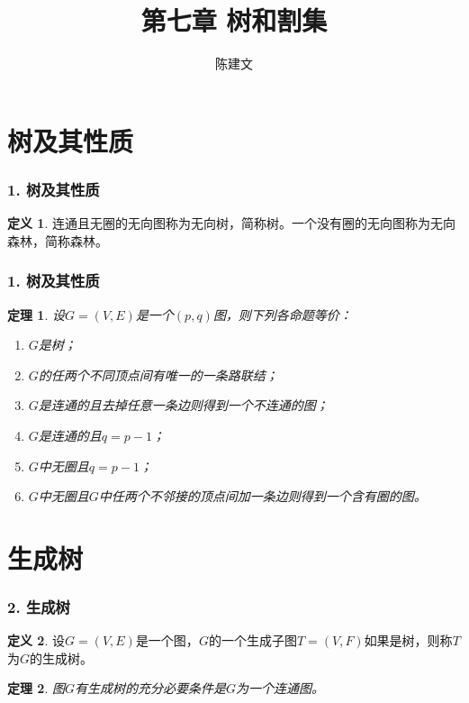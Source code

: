 \documentclass{beamer}
\begin{document}
\begin{CJK*}{UTF8}{gbsn}

\newtheorem{Thm}{定理}[section]
\theoremstyle{definition}
\newtheorem{Def}{定义}[section]
\theoremstyle{example}
\newtheorem*{Ex}{例：}
\date{}
\author{陈建文}

\title{第七章 树和割集}
\begin{frame}
  \titlepage
\end{frame}  
\section{树及其性质}
\begin{frame}
  \frametitle{1. 树及其性质}
  \begin{Def}
    连通且无圈的无向图称为无向树，简称\alert{树}。\pause 一个没有圈的无向图称为无向森林，简称\alert{森林}。
  \end{Def}
\end{frame}
\begin{frame}
  \frametitle{1. 树及其性质}
\begin{Thm}
  设$G=(V,E)$是一个$(p,q)$图，则下列各命题等价：
  \begin{enumerate}[(1)]
  \item $G$是树；
  \item $G$的任两个不同顶点间有唯一的一条路联结；
  \item $G$是连通的且去掉任意一条边则得到一个不连通的图；
  \item $G$是连通的且$q = p - 1$；
  \item $G$中无圈且$q = p - 1$；
    \item $G$中无圈且$G$中任两个不邻接的顶点间加一条边则得到一个含有圈的图。
  \end{enumerate}
\end{Thm}  
\end{frame}

\section{生成树}


\begin{frame}
  \frametitle{2. 生成树}
  \begin{Def}
    设$G=(V,E)$是一个图，$G$的一个生成子图$T=(V,F)$如果是树，则称$T$为$G$的\alert{生成树}。
  \end{Def}\pause
  \begin{Thm}
    图$G$有生成树的充分必要条件是$G$为一个连通图。
  \end{Thm}
\end{frame}

\end{CJK*}
\end{document}
